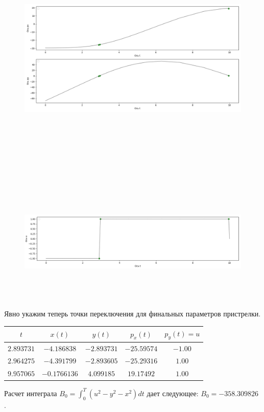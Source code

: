 \documentclass[a4paper,12pt]{article}
\begin{document}
\begin{figure}[H]
    \centering
      \includegraphics[width=\textwidth, height=12cm]{Figure1_2.png}
\end{figure}
\begin{figure}[H]
    \centering
      \includegraphics[width=\textwidth, height=6cm]{Figure1_3.png}
\end{figure}
Явно укажим теперь точки переключения для финальных параметров пристрелки.

\begin{center}
\begin{table}[H]
    \begin{tabular}{|c|c|c|c|c|}
        \hline
        $t$&$x(t)$&$y(t)$&$p_x(t)$&$p_y(t)=u$\\
        \hline
        $2.893731$&$-4.186838$&$-2.893731$&$-25.59574$&$-1.00$\\
        \hline
        $2.964275$&$-4.391799$&$-2.893605$&$-25.29316$&$1.00$\\
        \hline
        $9.957065$&$-0.1766136$&$4.099185$&$19.17492$&$1.00$\\
        \hline
    \end{tabular}
\end{table}
\end{center}
Расчет интеграла $B_0=\int_0^T(u^2-y^2-x^2)dt$ дает следующее: $B_0=-358.309826$ .
\end{document}
